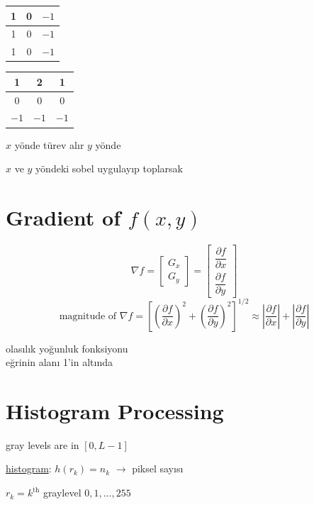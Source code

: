 \documentclass[11pt,a4paper]{article}
\begin{document}
\medskip
\noindent
\begin{tabular}{|c|c|c|}\hline 1 & 0 & $-1$ \\ \hline 1 & 0 & $-1$ \\ \hline 1 & 0 & $-1$ \\ \hline\end{tabular}

\medskip
\noindent
\begin{tabular}{|c|c|c|}\hline 1 & 2 & 1 \\ \hline 0 & 0 & 0 \\ \hline $-1$ & $-1$ & $-1$ \\ \hline\end{tabular}
\quad $x$ yönde türev alır \hfill $y$ yönde


$x$ ve $y$ yöndeki sobel uygulayıp toplarsak

\section{Gradient of $f(x,y)$}
\[
\nabla f = \begin{bmatrix} G_x \\ G_y \end{bmatrix}
= \begin{bmatrix} \dfrac{\partial f}{\partial x} \\[1ex] \dfrac{\partial f}{\partial y} \end{bmatrix}
\]
\[
\text{magnitude of } \nabla f = \left[ \left(\frac{\partial f}{\partial x}\right)^2 + \left(\frac{\partial f}{\partial y}\right)^2 \right]^{1/2}
\approx \left|\frac{\partial f}{\partial x}\right| + \left|\frac{\partial f}{\partial y}\right|
\]

olasılık yoğunluk fonksiyonu \\
eğrinin alanı 1'in altında


\section{Histogram Processing}
gray levels are in $[0, L-1]$

\underline{histogram}: $h(r_k) = n_k$ $\rightarrow$ piksel sayısı

$r_k = k^{\mathrm{th}}$ graylevel \qquad $0, 1, \dots, 255$
\end{document}

